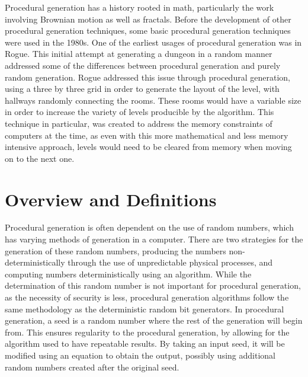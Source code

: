 \documentclass[12pt]{report}
\begin{document}
		Procedural generation has a history rooted in math, particularly the work involving Brownian motion as well as fractals. 
		Before the development of other procedural generation techniques, some basic procedural generation techniques were used in the 1980s. One of the earliest usages of procedural generation was in Rogue. This initial attempt at generating a dungeon in a random manner addressed some of the differences between procedural generation and purely random generation. Rogue addressed this issue through procedural generation,
		using a three by three grid in order to generate the layout of the level, with hallways randomly connecting the rooms. These rooms would have a variable size in order to increase the variety of levels producible by the algorithm. This technique in particular, was created to address the memory constraints of computers at the time, as even with this more mathematical and less memory  intensive approach, levels would need to be cleared from memory when moving on to the next one.  \\
		
		
		\section{Overview and Definitions}
		
		Procedural generation is often dependent on the use of random numbers, which has varying methods of generation in a computer. There are two strategies for the generation of these random numbers, producing the numbers non-deterministically through the use of unpredictable physical processes, and computing numbers deterministically using an algorithm. While the determination of this random number is not important for procedural generation, as the necessity of security is less, procedural generation algorithms follow the same methodology as the deterministic random bit generators. In procedural generation, a seed is a random number where the rest of the generation will begin from. This ensures regularity to the procedural generation, by allowing for the algorithm used to have repeatable results. By taking an input seed, it will be modified using an equation to obtain the output, possibly using additional random numbers created after the original seed. \\
		
\end{document}
